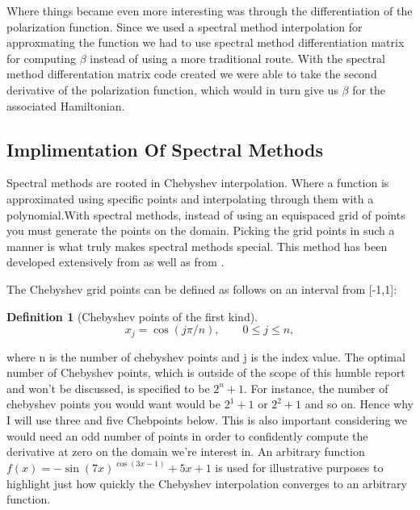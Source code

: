 \documentclass{report}
\theoremstyle{definition}
\newtheorem{definition}{Definition}
\begin{document}
Where things became even more interesting was through the differentiation of the polarization function. Since we used a spectral method interpolation for approxmating the function we had to use spectral method differentiation matrix for computing $\beta$ instead of using a more traditional route\cite{trefethen2000spectral}. With the spectral method differentation matrix code created we were able to take the second derivative of the polarization function, which would in turn give us $\beta$ for the associated Hamiltonian. 



\subsection*{Implimentation Of Spectral Methods}

 Spectral methods are rooted in Chebyshev interpolation. Where a function is approximated using specific points and interpolating through them with a polynomial.With spectral methods, instead of using an equispaced grid of points you must generate the points on the domain. Picking the grid points in such a manner is what truly makes spectral methods special. This method has been developed extensively from \cite{trefethen2000spectral,trefethen2013approximation} as well as from \cite{welfert1997generation}. 
 
 The Chebyshev grid points can be defined as follows on an interval from [-1,1]:


\begin{definition}[Chebyshev points of the first kind]

\begin{equation}
x_{j} = \cos(j \pi / n), \qquad  0 \leq j \leq n, 
\end{equation}

\end{definition}


\noindent where n is the number of chebyshev points and j is the index value. The optimal number of Chebyshev points, which is outside of the scope of this humble report and won't be discussed, is specified to be $2^{n}+1$. For instance, the number of chebyshev points you would want would be $2^{1}+1$ or $2^{2}+1$ and so on. Hence why I will use three and five Chebpoints below. This is also important considering we would need an odd number of points in order to confidently compute the derivative at zero on the domain we're interest in. An arbitrary function $f(x) = -\sin(7x)^{\cos(3x-1)}+5x+1$ is used for illustrative purposes to highlight just how quickly the Chebyshev interpolation converges to an arbitrary function. 
\end{document}
